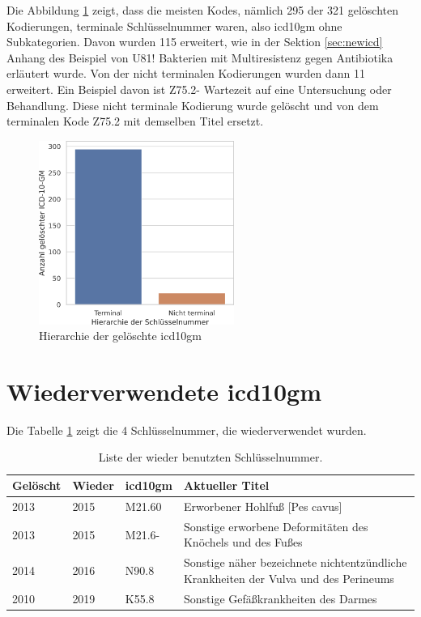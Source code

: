 Die Abbildung \ref{fig:oldicdort} zeigt, dass die meisten Kodes, nämlich \textsf{295} der \textsf{321} gelöschten Kodierungen, terminale Schlüsselnummer waren, also \ac{icd10gm} ohne Subkategorien. Davon wurden \textsf{115} erweitert, wie in der Sektion \ref{sec:newicd} Anhang des Beispiel von \textsf{U81!} \textsf{Bakterien mit Multiresistenz gegen Antibiotika} erläutert wurde. Von der nicht terminalen Kodierungen wurden dann \textsf{11} erweitert. Ein Beispiel davon ist \textsf{Z75.2-} \textsf{Wartezeit auf eine Untersuchung oder Behandlung}. Diese nicht terminale Kodierung wurde gelöscht und von dem terminalen Kode \textsf{Z75.2} mit demselben Titel ersetzt. 


\begin{figure}[ht]
	\centering
	\includegraphics[height=6cm]{figures/ortoldYear}
	\caption{Hierarchie der gelöschte \acs{icd10gm}}
	\label{fig:oldicdort}
\end{figure}


\section{Wiederverwendete \acs{icd10gm}} \label{sec:delinicd}

Die Tabelle \ref{tab:wieder} zeigt die \textsf{4} Schlüsselnummer, die wiederverwendet wurden.

\begin{table}[ht]
	\centering
	\small
	\caption[Wieder benutzte \acs{icd10gm}]{Liste der wieder benutzten Schlüsselnummer.}
	\label{tab:wieder}
	\begin{tabular}{|l|l|l|p{6cm}|}
		\hline
		\rowcolor{lightgray} Gelöscht & Wieder & \ac{icd10gm} & Aktueller Titel \\ \hline
		2013 & 2015 & M21.60 & Erworbener Hohlfuß [Pes cavus] \\ \hline
		2013 & 2015 & M21.6- & Sonstige erworbene Deformitäten des Knöchels und des Fußes \\ \hline
		2014 & 2016 & N90.8 & Sonstige näher bezeichnete nichtentzündliche Krankheiten der Vulva und des Perineums \\ \hline
		2010 & 2019 & K55.8 & Sonstige Gefäßkrankheiten des Darmes \\ \hline

\end{tabular}
\end{table}

